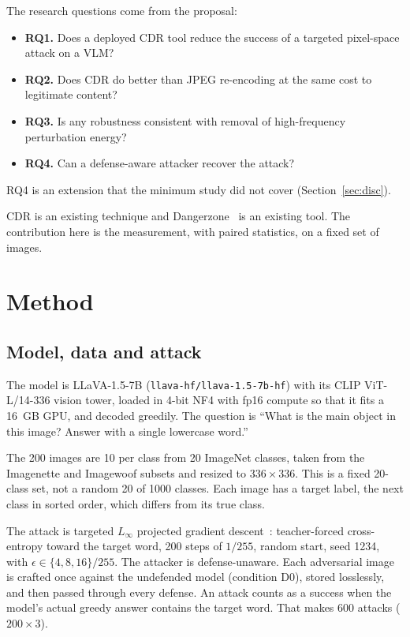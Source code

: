 \documentclass[11pt]{article}
\begin{document}
The research questions come from the proposal:
\begin{itemize}
\item \textbf{RQ1.} Does a deployed CDR tool reduce the success of a targeted pixel-space
attack on a VLM?
\item \textbf{RQ2.} Does CDR do better than JPEG re-encoding at the same cost to
legitimate content?
\item \textbf{RQ3.} Is any robustness consistent with removal of high-frequency
perturbation energy?
\item \textbf{RQ4.} Can a defense-aware attacker recover the attack?
\end{itemize}
RQ4 is an extension that the minimum study did not cover (Section~\ref{sec:disc}).

CDR is an existing technique and Dangerzone~\cite{dangerzone} is an existing tool. The
contribution here is the measurement, with paired statistics, on a fixed set of images.

\section{Method}

\subsection{Model, data and attack}
The model is LLaVA-1.5-7B (\texttt{llava-hf/llava-1.5-7b-hf}) with its CLIP ViT-L/14-336
vision tower, loaded in 4-bit NF4 with fp16 compute so that it fits a 16~GB GPU, and
decoded greedily. The question is ``What is the main object in this image? Answer with a
single lowercase word.''

The 200 images are 10 per class from 20 ImageNet classes, taken from the Imagenette and
Imagewoof subsets and resized to $336\times336$. This is a fixed 20-class set, not a
random 20 of 1000 classes. Each image has a target label, the next class in sorted
order, which differs from its true class.

The attack is targeted $L_\infty$ projected gradient descent~\cite{madry2018pgd}:
teacher-forced cross-entropy toward the target word, 200 steps of $1/255$, random
start, seed 1234, with $\epsilon\in\{4,8,16\}/255$. The attacker is defense-unaware.
Each adversarial image is crafted once against the undefended model (condition D0),
stored losslessly, and then passed through every defense. An attack counts as a success
when the model's actual greedy answer contains the target word. That makes 600 attacks
($200\times3$).
\end{document}
